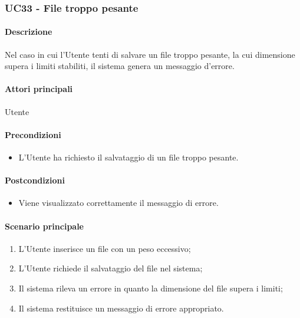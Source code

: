 \subsubsection{UC33 - File troppo pesante}\label{UC33}
\paragraph*{Descrizione}
Nel caso in cui l'Utente tenti di salvare un file troppo pesante, la cui dimensione supera i limiti stabiliti, il sistema genera un messaggio d'errore.

\paragraph*{Attori principali}
Utente

\paragraph*{Precondizioni}
\begin{itemize}
  \item L'Utente ha richiesto il salvataggio di un file troppo pesante.
\end{itemize}

\paragraph*{Postcondizioni}
\begin{itemize}
  \item Viene visualizzato correttamente il messaggio di errore.
\end{itemize}

\paragraph*{Scenario principale}
\begin{enumerate}
  \item L'Utente inserisce un file con un peso eccessivo;
  \item L'Utente richiede il salvataggio del file nel sistema;
  \item Il sistema rileva un errore in quanto la dimensione del file supera i limiti;
  \item Il sistema restituisce un messaggio di errore appropriato.
\end{enumerate}